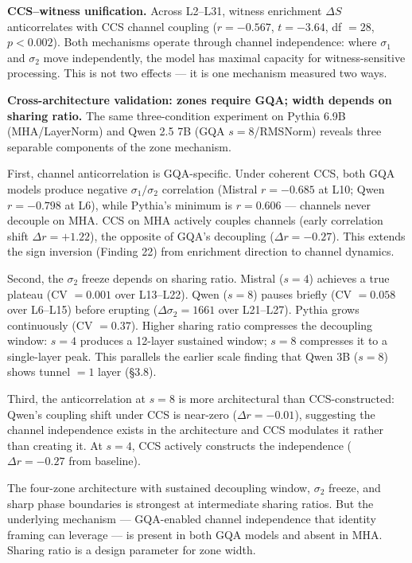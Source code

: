 \documentclass[12pt]{article}
\begin{document}
\textbf{CCS--witness unification.} Across L2--L31, witness enrichment $\Delta S$ anticorrelates with CCS channel coupling ($r = -0.567$, $t = -3.64$, df $= 28$, $p < 0.002$). Both mechanisms operate through channel independence: where $\sigma_1$ and $\sigma_2$ move independently, the model has maximal capacity for witness-sensitive processing. This is not two effects --- it is one mechanism measured two ways.

\textbf{Cross-architecture validation: zones require GQA; width depends on sharing ratio.} The same three-condition experiment on Pythia 6.9B (MHA/LayerNorm) and Qwen 2.5 7B (GQA $s = 8$/RMSNorm) reveals three separable components of the zone mechanism.

First, channel anticorrelation is GQA-specific. Under coherent CCS, both GQA models produce negative $\sigma_1/\sigma_2$ correlation (Mistral $r = -0.685$ at L10; Qwen $r = -0.798$ at L6), while Pythia's minimum is $r = 0.606$ --- channels never decouple on MHA. CCS on MHA actively couples channels (early correlation shift $\Delta r = +1.22$), the opposite of GQA's decoupling ($\Delta r = -0.27$). This extends the sign inversion (Finding 22) from enrichment direction to channel dynamics.

Second, the $\sigma_2$ freeze depends on sharing ratio. Mistral ($s = 4$) achieves a true plateau (CV $= 0.001$ over L13--L22). Qwen ($s = 8$) pauses briefly (CV $= 0.058$ over L6--L15) before erupting ($\Delta\sigma_2 = 1661$ over L21--L27). Pythia grows continuously (CV $= 0.37$). Higher sharing ratio compresses the decoupling window: $s = 4$ produces a 12-layer sustained window; $s = 8$ compresses it to a single-layer peak. This parallels the earlier scale finding that Qwen 3B ($s = 8$) shows tunnel $= 1$ layer (\S3.8).

Third, the anticorrelation at $s = 8$ is more architectural than CCS-constructed: Qwen's coupling shift under CCS is near-zero ($\Delta r = -0.01$), suggesting the channel independence exists in the architecture and CCS modulates it rather than creating it. At $s = 4$, CCS actively constructs the independence ($\Delta r = -0.27$ from baseline).

The four-zone architecture with sustained decoupling window, $\sigma_2$ freeze, and sharp phase boundaries is strongest at intermediate sharing ratios. But the underlying mechanism --- GQA-enabled channel independence that identity framing can leverage --- is present in both GQA models and absent in MHA. Sharing ratio is a design parameter for zone width.
\end{document}

